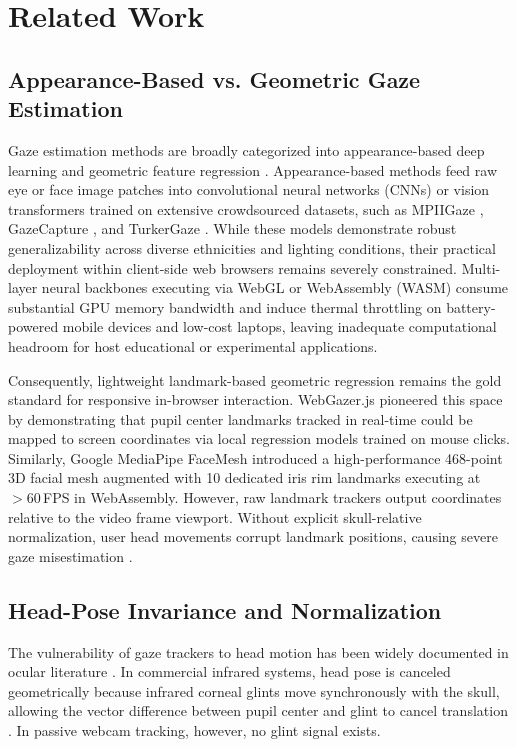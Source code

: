 \documentclass[10pt,twocolumn]{article}
\begin{document}
\section{Related Work}
\label{sec:related}

\subsection{Appearance-Based vs. Geometric Gaze Estimation}
Gaze estimation methods are broadly categorized into appearance-based deep learning and geometric feature regression \cite{hansen2010eye,holmqvist2011eye}. Appearance-based methods feed raw eye or face image patches into convolutional neural networks (CNNs) or vision transformers trained on extensive crowdsourced datasets, such as MPIIGaze \cite{zhang2015appearance}, GazeCapture \cite{krafka2016eye}, and TurkerGaze \cite{xu2015turkergaze}. While these models demonstrate robust generalizability across diverse ethnicities and lighting conditions, their practical deployment within client-side web browsers remains severely constrained. Multi-layer neural backbones executing via WebGL or WebAssembly (WASM) consume substantial GPU memory bandwidth and induce thermal throttling on battery-powered mobile devices and low-cost laptops, leaving inadequate computational headroom for host educational or experimental applications.

Consequently, lightweight landmark-based geometric regression remains the gold standard for responsive in-browser interaction. WebGazer.js \cite{papoutsaki2016webgazer} pioneered this space by demonstrating that pupil center landmarks tracked in real-time could be mapped to screen coordinates via local regression models trained on mouse clicks. Similarly, Google MediaPipe FaceMesh \cite{lugaresi2019mediapipe} introduced a high-performance 468-point 3D facial mesh augmented with 10 dedicated iris rim landmarks executing at $>60\,$FPS in WebAssembly. However, raw landmark trackers output coordinates relative to the video frame viewport. Without explicit skull-relative normalization, user head movements corrupt landmark positions, causing severe gaze misestimation \cite{luger2020invariance}.

\subsection{Head-Pose Invariance and Normalization}
The vulnerability of gaze trackers to head motion has been widely documented in ocular literature \cite{blignaut2009mapping,blignaut2014mapping,sesin2008investigation}. In commercial infrared systems, head pose is canceled geometrically because infrared corneal glints move synchronously with the skull, allowing the vector difference between pupil center and glint to cancel translation \cite{hansen2010eye}. In passive webcam tracking, however, no glint signal exists.
\end{document}
